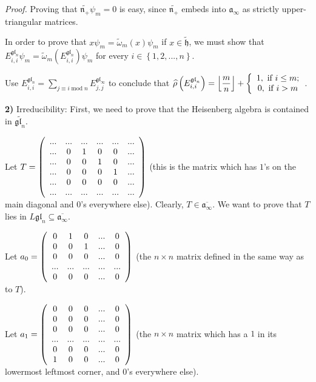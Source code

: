 \documentclass
[numbers=enddot,12pt,final,onecolumn,german,notitlepage]{scrartcl}%
\theoremstyle{definition}
\begin{document}
\textit{Proof.} Proving that $\widetilde{\mathfrak{n}_{+}}\psi_{m}=0$ is easy,
since $\widetilde{\mathfrak{n}_{+}}$ embeds into $\mathfrak{a}_{\infty}$ as
strictly upper-triangular matrices.

In order to prove that $x\psi_{m}=\widetilde{\omega}_{m}\left(  x\right)
\psi_{m}$ if $x\in\widetilde{\mathfrak{h}}$, we must show that $E_{i,i}%
^{\mathfrak{gl}_{n}}\psi_{m}=\widetilde{\omega}_{m}\left(  E_{i,i}%
^{\mathfrak{gl}_{n}}\right)  \psi_{m}$ for every $i\in\left\{
1,2,...,n\right\}  $.

Use $E_{i,i}^{\mathfrak{gl}_{n}}=\sum\limits_{j\equiv i\operatorname{mod}%
n}E_{j,j}^{\mathfrak{gl}_{\infty}}$ to conclude that $\widehat{\rho}\left(
E_{i,i}^{\mathfrak{gl}_{n}}\right)  =\left\lfloor \dfrac{m}{n}\right\rfloor
+\left\{
\begin{array}
[c]{c}%
1,\text{ if }i\leq m;\\
0,\text{ if }i>m
\end{array}
\right.  $.

\textbf{2)} Irreducibility: First, we need to prove that the Heisenberg
algebra is contained in $\widetilde{\mathfrak{gl}_{n}}$.

Let $T=\left(
\begin{array}
[c]{cccccc}%
... & ... & ... & ... & ... & ...\\
... & 0 & 1 & 0 & 0 & ...\\
... & 0 & 0 & 1 & 0 & ...\\
... & 0 & 0 & 0 & 1 & ...\\
... & 0 & 0 & 0 & 0 & ...\\
... & ... & ... & ... & ... & ...
\end{array}
\right)  $ (this is the matrix which has $1$'s on the main diagonal and $0$'s
everywhere else). Clearly, $T\in\overline{\mathfrak{a}_{\infty}}$. We want to
prove that $T$ lies in $L\mathfrak{gl}_{n}\subseteq\overline{\mathfrak{a}%
_{\infty}}$.

Let $a_{0}=\left(
\begin{array}
[c]{ccccc}%
0 & 1 & 0 & ... & 0\\
0 & 0 & 1 & ... & 0\\
0 & 0 & 0 & ... & 0\\
... & ... & ... & ... & ...\\
0 & 0 & 0 & ... & 0
\end{array}
\right)  $ (the $n\times n$ matrix defined in the same way as to $T$).

Let $a_{1}=\left(
\begin{array}
[c]{ccccc}%
0 & 0 & 0 & ... & 0\\
0 & 0 & 0 & ... & 0\\
0 & 0 & 0 & ... & 0\\
... & ... & ... & ... & ...\\
0 & 0 & 0 & ... & 0\\
1 & 0 & 0 & ... & 0
\end{array}
\right)  $ (the $n\times n$ matrix which has a $1$ in its lowermost leftmost
corner, and $0$'s everywhere else).
\end{document}
